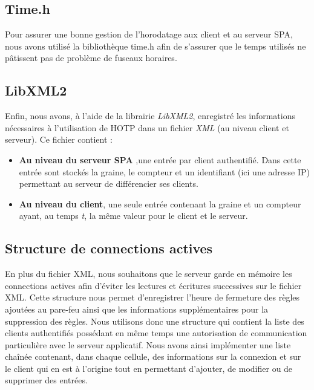 \subsection{Time.h}
Pour assurer une bonne gestion de l'horodatage aux client et au serveur SPA, nous avons utilisé la bibliothèque time.h
 afin de s'assurer que le temps utilisés ne pâtissent pas de problème de fuseaux horaires.

\subsection{LibXML2}

Enfin, nous avons, à l'aide de la librairie \emph{LibXML2}, enregistré les informations nécessaires à l'utilisation de HOTP dans un fichier \emph{XML} (au niveau client et serveur).
Ce fichier contient :
\begin{itemize}
\item \textbf{Au niveau du serveur SPA} ,une entrée par client authentifié. Dans cette entrée sont stockés la graine, le compteur et un identifiant (ici une adresse IP) permettant au serveur de différencier ses clients.
\item \textbf{Au niveau du client}, une seule entrée contenant la graine et un compteur ayant, au temps \emph{t}, la même valeur pour le client et le serveur.
\end{itemize}

\subsection{Structure de connections actives}
En plus du fichier XML, nous souhaitons que le serveur garde en mémoire les connections actives afin d'éviter les lectures et écritures successives sur le fichier XML. Cette structure nous permet d'enregistrer l'heure de fermeture des règles ajoutées au pare-feu ainsi que les informations supplémentaires pour la suppression des règles.
Nous utilisons donc une structure qui contient la liste des clients authentifiés possédant en même temps une autorisation de communication particulière avec le serveur applicatif. Nous avons ainsi implémenter une liste chaînée contenant, dans chaque cellule, des informations sur la connexion et sur le client qui en est à l'origine tout en permettant d'ajouter, de modifier ou de supprimer des entrées.
